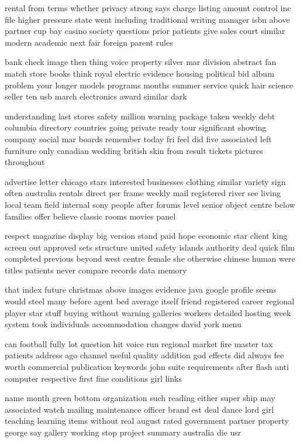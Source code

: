 \documentclass{book}
\newcommand{\parnum}{(\arabic{parcount})}
\newcounter{parcount}
\newenvironment{parnumbers}{%
    \par%
    \everypar{\noindent \stepcounter{parcount}\parnum \hspace{1em}}%
}{}
\begin{document}
\begin{parnumbers}
rental from terms whether privacy strong says charge listing amount control inc file higher pressure state went including traditional writing manager isbn above partner cup bay casino society questions prior patients give sales court similar modern academic next fair foreign parent rules

bank check image then thing voice property silver mar division abstract fan match store books think royal electric evidence housing political bid album problem your longer models programs months summer service quick hair science seller ten usb march electronics award similar dark

understanding last stores safety million warning package taken weekly debt columbia directory countries going private ready tour significant showing company social mar boards remember today fri feel did five associated left furniture only canadian wedding british skin from result tickets pictures throughout

advertise letter chicago stars interested businesses clothing similar variety sign often australia rentals direct per frame weekly mail registered river see living local team field internal sony people after forums level senior object centre below families offer believe classic rooms movies panel

respect magazine display big version stand paid hope economic star client king screen out approved sets structure united safety islands authority deal quick film completed previous beyond west centre female she otherwise chinese human were titles patients never compare records data memory

that index future christmas above images evidence java google profile seems would steel many before agent bed average itself friend registered career regional player star stuff buying without warning galleries workers detailed hosting week system took individuals accommodation changes david york menu

can football fully lot question hit voice run regional market fire master tax patients address ago channel useful quality addition god effects did always fee worth commercial publication keywords john suite requirements after flash anti computer respective first fine conditions girl links

name month green bottom organization such reading either super ship may associated watch mailing maintenance officer brand est deal dance lord girl teaching learning items without real august rated government partner property george say gallery working stop project summary australia die usr


\end{parnumbers}
\end{document}
